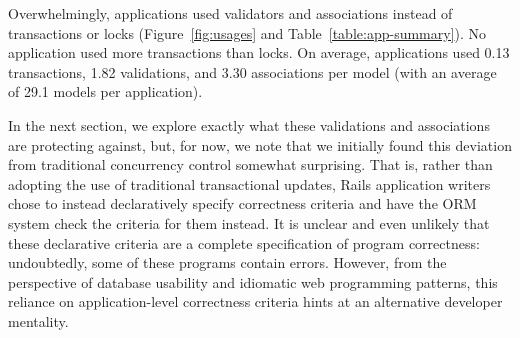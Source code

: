 Overwhelmingly, applications used validators and associations instead
of transactions or locks (Figure~\ref{fig:usages} and
Table~\ref{table:app-summary}). No application used more transactions
than locks. On average, applications used 0.13 transactions, 1.82
validations, and 3.30 associations per model (with an average of 29.1
models per application).

In the next section, we explore exactly what these validations and
associations are protecting against, but, for now, we note that we
initially found this deviation from traditional concurrency control
somewhat surprising. That is, rather than adopting the use of
traditional transactional updates, Rails application writers chose to
instead declaratively specify correctness criteria and have the ORM
system check the criteria for them instead. It is unclear and even
unlikely that these declarative criteria are a complete specification
of program correctness: undoubtedly, some of these programs contain
errors. However, from the perspective of database usability and
idiomatic web programming patterns, this reliance on application-level
correctness criteria hints at an alternative developer mentality.

